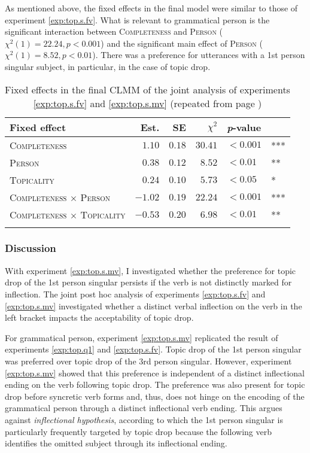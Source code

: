 As mentioned above, the fixed effects in the final model were similar to those of experiment \ref*{exp:top.s.fv}.
What is relevant to grammatical person is the significant interaction between \textsc{Completeness} and \textsc{Person} ($\chi^2(1) = 22.24, p < 0.001$) and the significant main effect of \textsc{Person} ($\chi^2(1) = 8.52, p < 0.01$).
There was a preference for utterances with a 1st person singular subject, in particular, in the case of topic drop.

\begin{table}
\caption{Fixed effects in the final CLMM of the joint analysis of experiments \ref*{exp:top.s.fv} and \ref*{exp:top.s.mv} (repeated from page \pageref{tab:model.exp.top.bv})}
\centering
\begin{tabular}{lrrrll}
\lsptoprule
Fixed effect & Est. & SE & $\chi^2$ & \textit{p}-value &   \\
\midrule
\textsc{Completeness} & $1.10$ & $0.18$ & $30.41$ & $< 0.001$ & ***\\
\textsc{Person} & $0.38$ & $0.12$ &  $8.52$ & $< 0.01$ & **\\
\textsc{Topicality} & $0.24$ & $0.10$ & $5.73$ & $< 0.05$ & *\\
\textsc{Completeness $\times$ Person} & $-1.02$ & $0.19$ & $22.24$ & $< 0.001$ & ***\\
\textsc{Completeness $\times$ Topicality} & $-0.53$ & $0.20$ & $6.98$ & $< 0.01$ & **\\
\lspbottomrule
\end{tabular}
\label{tab:model.exp.top.bv.rep}
\end{table}

\subsubsection{Discussion}\label{sec:exp.top.s.mv.person.diss}
With experiment \ref*{exp:top.s.mv}, I investigated whether the preference for topic drop of the 1st person singular persists if the verb is not distinctly marked for inflection.
The joint post hoc analysis of experiments \ref*{exp:top.s.fv} and \ref*{exp:top.s.mv} investigated whether a distinct verbal inflection on the verb in the left bracket impacts the acceptability of topic drop.

For grammatical person, experiment \ref*{exp:top.s.mv} replicated the result of experiments \ref*{exp:top.q1} and \ref*{exp:top.s.fv}.
Topic drop of the 1st person singular was preferred over topic drop of the 3rd person singular.
However, experiment \ref*{exp:top.s.mv} showed that this preference is independent of a distinct inflectional ending on the verb following topic drop.
The preference was also present for topic drop before syncretic  verb forms and, thus, does not hinge on the encoding of the grammatical person through a distinct inflectional verb ending.
This argues against  \textit{inflectional hypothesis}, according to which the 1st person singular is particularly frequently targeted by topic drop because the following verb identifies the omitted subject through its inflectional ending.

